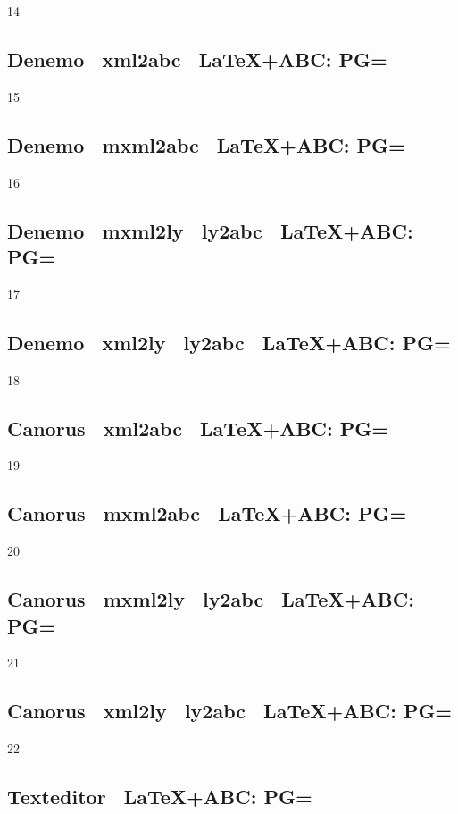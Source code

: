 14

\subsection{Denemo \ra\ xml2abc \ra\ \LaTeX+ABC: PG=}

15

\subsection{Denemo \ra\ mxml2abc \ra\ \LaTeX+ABC: PG=} 

16

\subsection{Denemo \ra\ mxml2ly \ra\ ly2abc \ra\ \LaTeX+ABC: PG=} 

17

\subsection{Denemo \ra\ xml2ly \ra\ ly2abc \ra\ \LaTeX+ABC: PG=} 

18

\subsection{Canorus \ra\ xml2abc \ra\ \LaTeX+ABC: PG=} 

19

\subsection{Canorus \ra\ mxml2abc \ra\ \LaTeX+ABC: PG=} 

20

\subsection{Canorus \ra\ mxml2ly \ra\ ly2abc \ra\ \LaTeX+ABC: PG=} 

21

\subsection{Canorus \ra\ xml2ly \ra\ ly2abc \ra\ \LaTeX+ABC: PG=} 

22

\subsection{Texteditor \ra\ \LaTeX+ABC: PG=}

